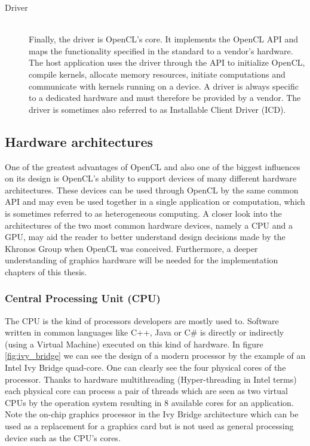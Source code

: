 \begin{description}
	\item[Driver] \hfill \\
	Finally, the driver is OpenCL's core. It implements the OpenCL API and maps the functionality specified in the standard to a vendor's hardware. The host application uses the driver through the API to initialize OpenCL, compile kernels, allocate memory resources, initiate computations and communicate with kernels running on a device. A driver is always specific to a dedicated hardware and must therefore be provided by a vendor. The driver is sometimes also referred to as Installable Client Driver (ICD).
\end{description}

\subsection{Hardware architectures}
\label{sec:hardware_arch}

One of the greatest advantages of OpenCL and also one of the biggest influences on its design is OpenCL's ability to support devices of many different hardware architectures. These devices can be used through OpenCL by the same common API and may even be used together in a single application or computation, which is sometimes referred to as heterogeneous computing.
A closer look into the architectures of the two most common hardware devices, namely a CPU and a GPU, may aid the reader to better understand design decisions made by the Khronos Group when OpenCL was conceived. Furthermore, a deeper understanding of graphics hardware will be needed for the implementation chapters of this thesis.

\subsubsection{Central Processing Unit (CPU)}

The CPU is the kind of processors developers are mostly used to. Software written in common languages like C++, Java or C\# is directly or indirectly (using a Virtual Machine) executed on this kind of hardware.
In figure \ref{fig:ivy_bridge} we can see the design of a modern processor by the example of an Intel Ivy Bridge quad-core. One can clearly see the four physical cores of the processor. Thanks to hardware multithreading (Hyper-threading in Intel terms) each physical core can process a pair of threads which are seen as two virtual CPUs by the operation system resulting in 8 available cores for an application.
Note the on-chip graphics processor in the Ivy Bridge architecture which can be used as a replacement for a graphics card but is not used as general processing device such as the CPU's cores.

